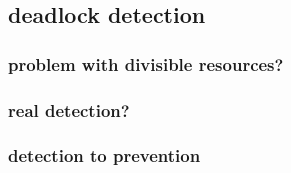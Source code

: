 \subsection{deadlock detection}



\subsubsection{problem with divisible resources?}


\subsubsection{real detection?}


\subsubsection{detection to prevention}

